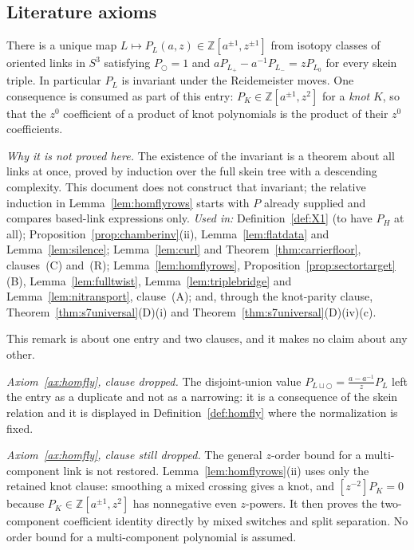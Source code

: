 \subsection{Literature axioms}

\begin{axiom}[HOMFLY--PT]\label{ax:homfly}
There is a unique map $L\mapsto P_L(a,z)\in\mathbb Z[a^{\pm1},z^{\pm1}]$ from
isotopy classes of oriented links in $S^3$ satisfying
$P_{\bigcirc}=1$ and $aP_{L_+}-a^{-1}P_{L_-}=zP_{L_0}$ for every skein triple.
In particular $P_L$ is invariant under the Reidemeister moves. One consequence
is consumed as part of this entry: $P_K\in\mathbb Z[a^{\pm1},z^2]$ for a
\emph{knot} $K$, so that the $z^0$ coefficient of a product of knot
polynomials is the product of their $z^0$ coefficients.

\emph{Why it is not proved here.} The existence of the invariant is a theorem
about all links at once, proved by induction over the full skein tree with a
descending complexity. This document does not construct that invariant; the relative induction in
Lemma~\ref{lem:homflyrows} starts with $P$ already supplied and compares
based-link expressions only.
\emph{Used in:} Definition~\ref{def:X1} (to have $P_H$ at all);
Proposition~\ref{prop:chamberinv}(ii), Lemma~\ref{lem:flatdata} and
Lemma~\ref{lem:silence}; Lemma~\ref{lem:curl} and Theorem~\ref{thm:carrierfloor},
clauses~(C) and~(R); Lemma~\ref{lem:homflyrows},
Proposition~\ref{prop:sectortarget}(B), Lemma~\ref{lem:fulltwist},
Lemma~\ref{lem:triplebridge} and Lemma~\ref{lem:nitransport}, clause~(A); and, through the
knot-parity clause, Theorem~\ref{thm:s7universal}(D)(i) and
Theorem~\ref{thm:s7universal}(D)(iv)(c).
\end{axiom}

\begin{remark}
\label{rem:homflywhole}
This remark is about one entry and two clauses, and it makes no claim about
any other.

\emph{Axiom~\ref{ax:homfly}, clause dropped.} The disjoint-union value
$P_{L\sqcup\bigcirc}=\frac{a-a^{-1}}{z}P_L$ left the entry as a duplicate and
not as a narrowing: it is a consequence of the skein relation and it is
displayed in Definition~\ref{def:homfly} where the normalization is fixed.

\emph{Axiom~\ref{ax:homfly}, clause still dropped.} The general
$z$-order bound for a multi-component link is not restored.
Lemma~\ref{lem:homflyrows}(ii) uses only the retained knot clause: smoothing a
mixed crossing gives a knot, and
$[z^{-2}]P_K=0$ because $P_K\in\mathbb Z[a^{\pm1},z^2]$ has nonnegative even
$z$-powers. It then proves the two-component coefficient identity directly by
mixed switches and split separation. No order bound for a multi-component
polynomial is assumed.

\end{remark}

